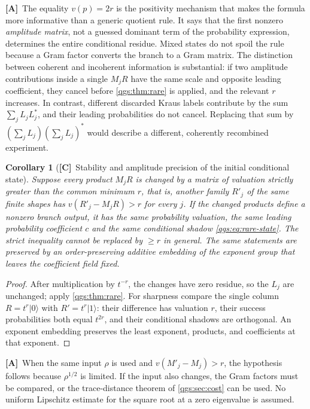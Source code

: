 \documentclass[11pt,oneside]{article}
\numberwithin{equation}{section}
\theoremstyle{plain}
\newtheorem{corollary}[corollary]{Corollary}
\theoremstyle{definition}
\theoremstyle{remark}
\newcommand{\ket}[1]{\lvert#1\rangle}
\newcommand{\TC}{\textcolor{TierC}{\textsf{\bfseries[C]}}}
\newcommand{\TA}{\textcolor{TierA}{\textsf{\bfseries[A]}}}
\begin{document}
\TA\ The equality $v(p)=2r$ is the positivity mechanism that makes the formula more informative than a generic quotient rule. It says that the first nonzero \emph{amplitude matrix}, not a guessed dominant term of the probability expression, determines the entire conditional residue. Mixed states do not spoil the rule because a Gram factor converts the branch to a Gram matrix. The distinction between coherent and incoherent information is substantial: if two amplitude contributions inside a single $M_jR$ have the same scale and opposite leading coefficient, they cancel before \cref{qgs:thm:rare} is applied, and the relevant $r$ increases. In contrast, different discarded Kraus labels contribute by the sum $\sum_jL_jL_j^*$, and their leading probabilities do not cancel. Replacing that sum by $(\sum_jL_j)(\sum_jL_j)^*$ would describe a different, coherently recombined experiment.

\begin{corollary}[\TC\ Stability and amplitude precision of the initial conditional state]\label{qgs:cor:initialstability}\label{qgs:ops:cor:amplitude-precision}
Suppose every product $M_jR$ is changed by a matrix of valuation strictly greater than the common minimum $r$, that is, another family $R'_j$ of the same finite shapes has $v(R'_j-M_jR)>r$ for every $j$. If the changed products define a nonzero branch output, it has the same probability valuation, the same leading probability coefficient $c$ and the same conditional shadow \eqref{qgs:eq:rare-state}. The strict inequality cannot be replaced by $\ge r$ in general. The same statements are preserved by an order-preserving additive embedding of the exponent group that leaves the coefficient field fixed.
\end{corollary}
\begin{proof}
After multiplication by $t^{-r}$, the changes have zero residue, so the $L_j$ are unchanged; apply \cref{qgs:thm:rare}. For sharpness compare the single column $R=t^r\ket0$ with $R'=t^r\ket1$: their difference has valuation $r$, their success probabilities both equal $t^{2r}$, and their conditional shadows are orthogonal. An exponent embedding preserves the least exponent, products, and coefficients at that exponent.
\end{proof}

\TA\ When the same input $\rho$ is used and $v(M'_j-M_j)>r$, the hypothesis follows because $\rho^{1/2}$ is limited. If the input also changes, the Gram factors must be compared, or the trace-distance theorem of \cref{qgs:sec:cost} can be used. No uniform Lipschitz estimate for the square root at a zero eigenvalue is assumed.
\end{document}
